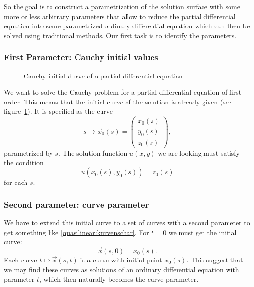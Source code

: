 So the goal is to construct a parametrization of the solution surface
with some more or less arbitrary parameters that allow to reduce the
partial differential equation into some parametrized ordinary
differential equation which can then be solved using traditional methods.
Our first task is to identify the parameters.

\subsubsection{First Parameter: Cauchy initial values}
\begin{figure}
\centering
{}
\caption{Cauchy initial durve of a partial differential equation.
\label{geometrie:cauchy-anfangskurve}}
\end{figure}
We want to solve the Cauchy problem for a partial differential
equation of first order.
This means that the initial curve of the solution is already given
(see figure~\ref{geometrie:cauchy-anfangskurve}).
It is specified as the curve
\begin{equation}
s\mapsto\vec x_0(s)=\begin{pmatrix}
x_0(s)\\
y_0(s)\\
z_0(s)
\end{pmatrix},
\label{quasilinear:anfangskurve}
\end{equation}
parametrized by $s$.
The solution function $u(x,y)$ we are looking must satisfy
the condition
\[
u(x_0(s), y_0(s))=z_0(s)
\]
for each $s$.

\subsubsection{Second parameter: curve parameter}
We have to extend this initial curve to a set of curves with a
second parameter to get something like \eqref{quasilinear:kurvenschar}.
For $t=0$ we must get the initial curve:
\[
\vec x(s,0)=x_0(s).
\]
Each curve $t\mapsto \vec x(s,t)$ is a curve with initial point $x_0(s)$.
This suggest that we may find these curves as solutions of an ordinary
differential equation with parameter $t$, which then naturally becomes
the curve parameter.

